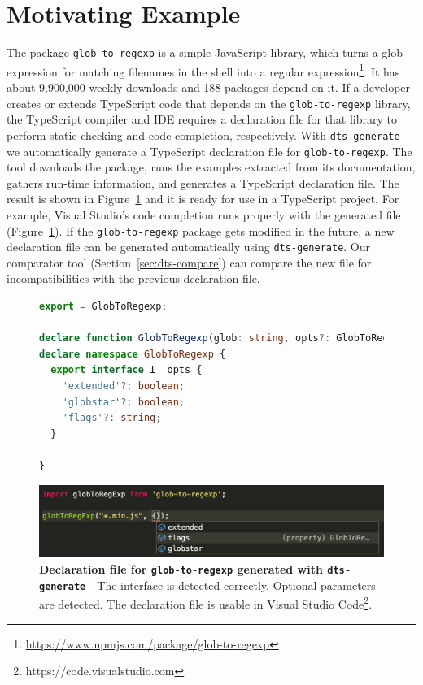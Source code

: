 \documentclass[english,cleveref,autoref,submission]{programming}
\newcommand{\figref}[1]{Figure~\ref{#1}}
\begin{document}
\section{Motivating Example}
\label{sec:motivating-example}
The \NPM{} package \texttt{glob-to-regexp} is a simple JavaScript library, which turns a
glob expression for matching filenames in the shell into a regular
expression\footnote{\url{https://www.npmjs.com/package/glob-to-regexp}}. It 
has about 9,900,000 weekly downloads and 188 \NPM{} packages depend on it. If
a developer creates or extends TypeScript code that depends on the
\texttt{glob-to-regexp} library, the TypeScript
compiler and IDE requires a declaration file for that library to
perform static checking and code completion, respectively. With
\texttt{dts-generate} we automatically generate a TypeScript
declaration file for \texttt{glob-to-regexp}. The tool downloads the \NPM{} 
package, runs the examples extracted from its documentation, gathers
run-time information, and generates a TypeScript declaration
file. The result is 
shown in \figref{fig:motivating-example-glob-to-regexp-vscode} and it is
ready for use in a TypeScript project. For example,  Visual Studio's
code completion runs properly with the generated file
(\figref{fig:motivating-example-glob-to-regexp-vscode}). If the
\texttt{glob-to-regexp} package gets modified in the future, a new declaration
file can be generated automatically using
\texttt{dts-generate}. Our comparator tool (Section~\ref{sec:dts-compare}) can compare the new file
for incompatibilities with the previous declaration file.

\begin{figure}[tp]
  \centering
    \begin{lstlisting}[language=TypeScript,numbers=none]
export = GlobToRegexp;

declare function GlobToRegexp(glob: string, opts?: GlobToRegexp.I__opts): RegExp;
declare namespace GlobToRegexp {
  export interface I__opts {
    'extended'?: boolean;
    'globstar'?: boolean;
    'flags'?: string;
  }

}
    \end{lstlisting}
  \begin{center}
    \includegraphics[width=0.8\linewidth]{motivating-example-glob-to-regexp-vscode.png}
  \end{center}

  \caption{\textbf{Declaration file for \texttt{glob-to-regexp}
      generated with \texttt{dts-generate}} - The interface is
    detected correctly. Optional parameters are detected. The
    declaration file is usable in Visual Studio
    Code\footnote{https://code.visualstudio.com}.} 
  \label{fig:motivating-example-glob-to-regexp-vscode}
\end{figure}
\end{document}
